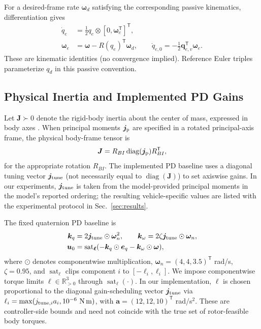 \documentclass[letterpaper, 10 pt, conference]{ieeeconf}
\newcommand{\T}{^{\mathsf T}}
\newcommand{\sat}{\operatorname{sat}}
\begin{document}
For a desired-frame rate $\bm\omega_d$ satisfying the corresponding passive kinematics, differentiation gives
\begin{align}
 \dot q_e&=\tfrac12q_e\otimes[0,\bm\omega_e\T]\T,\\
 \bm\omega_e&=\bm\omega-R(q_e)\T\bm\omega_d,\qquad
 \dot q_{e,0}=-\tfrac12\bm q_{e,v}\T\bm\omega_e.
 \label{eq:errkin}
\end{align}
These are kinematic identities (no convergence implied). Reference Euler triples parameterize $q_d$ in this passive convention.

\subsection{Physical Inertia and Implemented PD Gains}
Let $\bm J\succ0$ denote the rigid-body inertia about the center of mass, expressed in body axes \cite{schaub2018amss}. When principal moments $\bm j_{\rm p}$ are specified in a rotated principal-axis frame, the physical body-frame tensor is
\begin{equation}
 \bm J=R_{BI}\operatorname{diag}(\bm j_{\rm p})R_{BI}\T,
 \label{eq:inertiaframe}
\end{equation}
for the appropriate rotation $R_{BI}$. The implemented PD baseline uses a diagonal tuning vector $\bm j_{\rm tune}$ (not necessarily equal to $\operatorname{diag}(\bm J)$) to set axiswise gains. In our experiments, $\bm j_{\rm tune}$ is taken from the model-provided principal moments in the model's reported ordering; the resulting vehicle-specific values are listed with the experimental protocol in Sec.~\ref{sec:results}.

The fixed quaternion PD baseline is
\begin{align}
 \bm k_q&=2\bm j_{\rm tune}\odot\bm\omega_n^2,\qquad
 \bm k_\omega=2\zeta\bm j_{\rm tune}\odot\bm\omega_n,\\
 \bm u_0&=\sat_{\bm\ell}
       (-\bm k_q\odot\bm e_q-\bm k_\omega\odot\bm\omega),
 \label{eq:pd}
\end{align}
where $\odot$ denotes componentwise multiplication,
$\bm\omega_n=(4,4,3.5)\T$ rad/s, $\zeta=0.95$, and
$\sat_{\bm\ell}$ clips component $i$ to $[-\ell_i,\ell_i]$.
We impose componentwise torque limits $\bm\ell\in\mathbb R_{>0}^3$ through $\sat_{\bm\ell}(\cdot)$. In our implementation, $\bm\ell$ is chosen proportional to the diagonal gain-scheduling vector $\bm j_{\rm tune}$ via
$\ell_i=\max(j_{{\rm tune},i}a_i,10^{-6}\ \mathrm{N\,m})$,
with $\bm a=(12,12,10)\T$ rad/s$^2$. These are controller-side bounds and need not coincide with the true set of rotor-feasible body torques.
\end{document}

